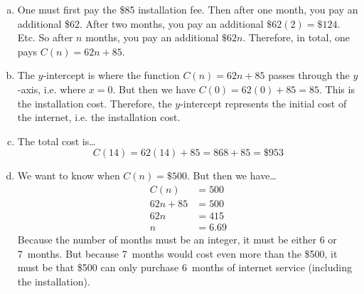 \documentclass[11pt,letterpaper]{article}
\begin{document}
\sol
{\itshape
\begin{enumerate}[(a)]
\item One must first pay the \$85 installation fee. Then after one month, you pay an additional \$62. After two months, you pay an additional $\$62(2)= \$124$. Etc. So after $n$ months, you pay an additional $\$62n$. Therefore, in total, one pays $C(n)= 62n + 85$. \pspace


\item The $y$-intercept is where the function $C(n)= 62n + 85$ passes through the $y$-axis, i.e. where $x= 0$. But then we have $C(0)= 62(0) + 85= 85$. This is the installation cost. Therefore, the $y$-intercept represents the initial cost of the internet, i.e. the installation cost. \pspace


\item The total cost is\dots
	\[
	C(14)= 62(14) + 85= 868 + 85= \$953
	\] \pspace


\item We want to know when $C(n)= \$500$. But then we have\dots
	\[
	\begin{aligned}
	C(n)&= 500 \\
	62n + 85&= 500 \\
	62n&= 415 \\
	n&= 6.69
	\end{aligned}
	\] 
Because the number of months must be an integer, it must be either 6 or 7~months. But because 7~months would cost even more than the \$500, it must be that \$500 can only purchase 6~months of internet service (including the installation). 
\end{enumerate}
}


\end{document}
